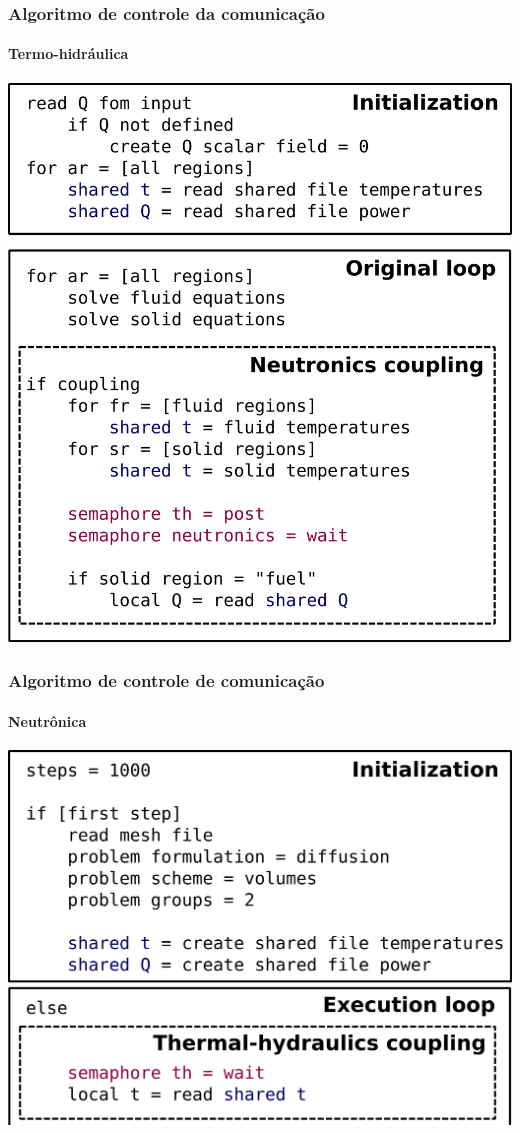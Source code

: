\documentclass[svgnames,smaller,table]{beamer}
\begin{document}
\begin{frame}
  \frametitle{Algoritmo de controle da comunicação}
  \framesubtitle{Termo-hidráulica}
  \centering\includegraphics[scale=0.3]{../figuras/algoritmo_openfoam.png}  
\end{frame}


\begin{frame}
  \frametitle{Algoritmo de controle de comunicação}
  \framesubtitle{Neutrônica}
  \centering\includegraphics[scale=0.4]{../figuras/algo-mil-apre1.png}
\end{frame}
\end{document}
